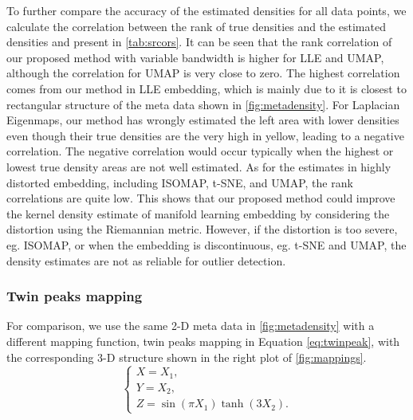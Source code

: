 \documentclass[11pt,a4paper,]{article}
\begin{document}
To further compare the accuracy of the estimated densities for all data points, we calculate the correlation between the rank of true densities and the estimated densities and present in \autoref{tab:srcors}. It can be seen that the rank correlation of our proposed method with variable bandwidth is higher for LLE and UMAP, although the correlation for UMAP is very close to zero. The highest correlation comes from our method in LLE embedding, which is mainly due to it is closest to rectangular structure of the meta data shown in \autoref{fig:metadensity}. For Laplacian Eigenmaps, our method has wrongly estimated the left area with lower densities even though their true densities are the very high in yellow, leading to a negative correlation. The negative correlation would occur typically when the highest or lowest true density areas are not well estimated. As for the estimates in highly distorted embedding, including ISOMAP, t-SNE, and UMAP, the rank correlations are quite low. This shows that our proposed method could improve the kernel density estimate of manifold learning embedding by considering the distortion using the Riemannian metric. However, if the distortion is too severe, eg. ISOMAP, or when the embedding is discontinuous, eg. t-SNE and UMAP, the density estimates are not as reliable for outlier detection.

\hypertarget{twin-peaks-mapping}{%
\subsubsection{Twin peaks mapping}\label{twin-peaks-mapping}}

For comparison, we use the same 2-D meta data in \autoref{fig:metadensity} with a different mapping function, twin peaks mapping in Equation \eqref{eq:twinpeak}, with the corresponding 3-D structure shown in the right plot of \autoref{fig:mappings}.
\begin{equation}
\label{eq:twinpeak}
\left\{ 
\begin{array}{lcl}
X = X_1, \\
Y = X_2, \\
Z = \sin(\pi X_1) \tanh (3 X_2).
\end{array}
\right.
\end{equation}
\end{document}
